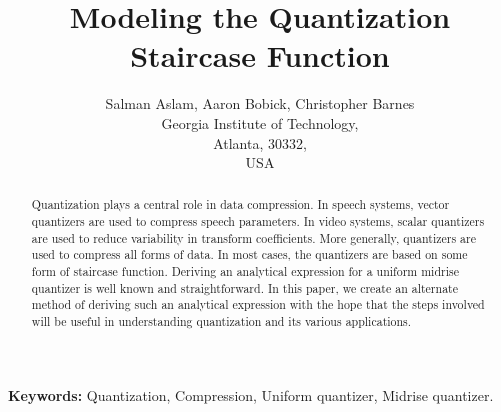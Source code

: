 \documentclass[12pt]{article}
\begin{document}

\pagestyle{plain} 

\title{Modeling the Quantization Staircase Function}
\author{
Salman Aslam, Aaron Bobick, Christopher Barnes\\   
Georgia Institute of Technology,\\
Atlanta, 30332,\\
USA
}
\maketitle


\begin{abstract}
Quantization plays a central role in data compression.  In speech systems, vector quantizers are used to compress speech parameters.  In video systems, scalar quantizers are used to reduce variability in transform coefficients.  More generally, quantizers are used to compress all forms of data.  In most cases, the quantizers are based on some form of staircase function.  Deriving an analytical expression for a uniform midrise quantizer is well known and straightforward.  In this paper, we create an alternate method of deriving such an analytical expression with the hope that the steps involved will be useful in understanding quantization and its various applications.  
\end{abstract}

{\bf Keywords:} Quantization, Compression, Uniform quantizer, Midrise quantizer.\\

\end{document}
